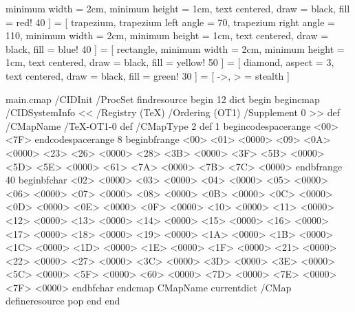 	minimum width = 2cm, 
	minimum height = 1cm, 
	text centered, 
	draw = black, 
	fill = red! 40
]
 = 
[	trapezium, 
	trapezium left angle = 70, 
	trapezium right angle = 110, 
	minimum width = 2cm, 
	minimum height = 1cm, 
	text centered, 
	draw = black, 
	fill = blue! 40
]
 = 
[	rectangle, 
	minimum width = 2cm, 
	minimum height = 1cm, 
	text centered, 
	draw = black, 
	fill = yellow! 50
]
 = 
[	diamond, 
	aspect = 3, 
	text centered, 
	draw = black, 
	fill = green! 30
]
 = 
[	->, 
	> = stealth
]
\newcommand{\drawbarcode}[1]{\EANisbn[SC5a, ISBN = #1]}
\renewcommand{\thefootnote}{\fnsymbol{footnote}}
\usepackage[resetfonts]{cmap}
\usepackage{fancyvrb}
\begin{VerbatimOut}{main.cmap}
	/CIDInit /ProcSet findresource begin
	12 dict begin
	begincmap
	/CIDSystemInfo
	<< /Registry (TeX)
	/Ordering (OT1)
	/Supplement 0
	>> def
	/CMapName /TeX-OT1-0 def
	/CMapType 2 def
	1 begincodespacerange
	<00> <7F>
	endcodespacerange
	8 beginbfrange
	<00> <01> <0000>
	<09> <0A> <0000>
	<23> <26> <0000>
	<28> <3B> <0000>
	<3F> <5B> <0000>
	<5D> <5E> <0000>
	<61> <7A> <0000>
	<7B> <7C> <0000>
	endbfrange
	40 beginbfchar
	<02> <0000>
	<03> <0000>
	<04> <0000>
	<05> <0000>
	<06> <0000>
	<07> <0000>
	<08> <0000>
	<0B> <0000>
	<0C> <0000>
	<0D> <0000>
	<0E> <0000>
	<0F> <0000>
	<10> <0000>
	<11> <0000>
	<12> <0000>
	<13> <0000>
	<14> <0000>
	<15> <0000>
	<16> <0000>
	<17> <0000>
	<18> <0000>
	<19> <0000>
	<1A> <0000>
	<1B> <0000>
	<1C> <0000>
	<1D> <0000>
	<1E> <0000>
	<1F> <0000>
	<21> <0000>
	<22> <0000>
	<27> <0000>
	<3C> <0000>
	<3D> <0000>
	<3E> <0000>
	<5C> <0000>
	<5F> <0000>
	<60> <0000>
	<7D> <0000>
	<7E> <0000>
	<7F> <0000>
	endbfchar
	endcmap
	CMapName currentdict /CMap defineresource pop
	end
	end
\end{VerbatimOut}
\makeatother
